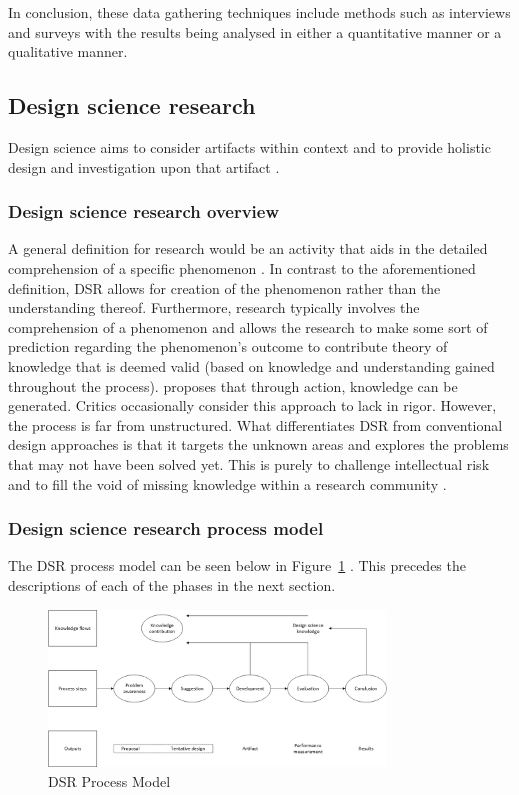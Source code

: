 In conclusion, these data gathering techniques include methods such as interviews and surveys with the results being analysed in either a quantitative manner or a qualitative manner.

\subsection{Design science research}
Design science aims to consider artifacts within context and to provide holistic design and investigation upon that artifact \citep{wieringa2014design}.

\subsubsection{Design science research overview}
A general definition for research would be an activity that aids in the detailed comprehension of a specific phenomenon \citep{Vaishnavi2015}. In contrast to the aforementioned definition, DSR allows for creation of the phenomenon rather than the understanding thereof. Furthermore, research typically involves the comprehension of a phenomenon and allows the research to make some sort of prediction regarding the phenomenon’s outcome to contribute theory of knowledge that is deemed valid (based on knowledge and understanding gained throughout the process). \cite{owen1998design} proposes that through action, knowledge can be generated. Critics occasionally consider this approach to lack in rigor. However, the process is far from unstructured.
What differentiates DSR from conventional design approaches is that it targets the unknown areas and explores the problems that may not have been solved yet. This is purely to challenge intellectual risk and to fill the void of missing knowledge within a research community \citep{Vaishnavi2015}.


\subsubsection{Design science research process model}
The DSR process model can be seen below in Figure~\ref{fig:DSR_Process_Model} \citep{Vaishnavi2015}. This precedes the descriptions of each of the phases in the next section.
\begin{figure}[ht]
\centering
\includegraphics[width=0.8\textwidth]{Chapter1/Figs/Figure1-2.png}
% 
\caption{DSR Process Model}
\label{fig:DSR_Process_Model}
\end{figure}

